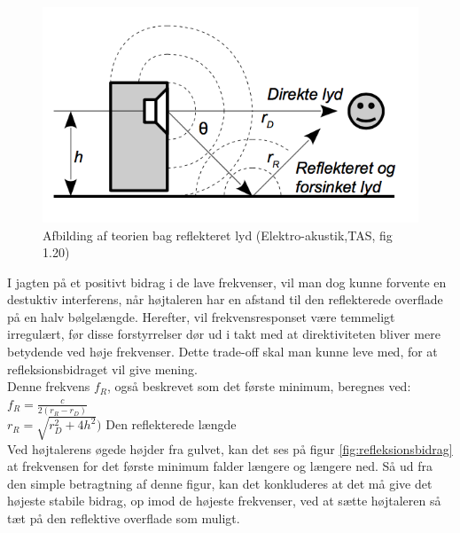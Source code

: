 \begin{figure}[h!]
	\centering
	\includegraphics[width=.7\textwidth]{Pics/reflect}
	\caption{Afbilding af teorien bag reflekteret lyd (Elektro-akustik,TAS, fig 1.20) } 
	\label{fig:reflect}
\end{figure}

I jagten på et positivt bidrag i de lave frekvenser, vil man dog kunne forvente en destuktiv interferens, når højtaleren har en afstand til den reflekterede overflade på en halv bølgelængde. Herefter, vil frekvensresponset være temmeligt irregulært, før disse forstyrrelser dør ud i takt med at direktiviteten bliver mere betydende ved høje frekvenser. Dette trade-off skal man kunne leve med, for at refleksionsbidraget vil give mening.\\

Denne frekvens \textbf{$f_R$}, også beskrevet som det første minimum, beregnes ved:\\

\(f_R=\frac{c}{2(r_R-r_D)}\)\\
\(r_R=\sqrt{r_D^2+4h^2})\) \hspace{2cm}Den reflekterede længde\\

Ved højtalerens øgede højder fra gulvet, kan det ses på figur \ref{fig:refleksionsbidrag} at frekvensen for det første minimum falder længere og længere ned. Så ud fra den simple betragtning af denne figur, kan det konkluderes at det må give det højeste stabile bidrag, op imod de højeste frekvenser, ved at sætte højtaleren så tæt på den reflektive overflade som muligt.

